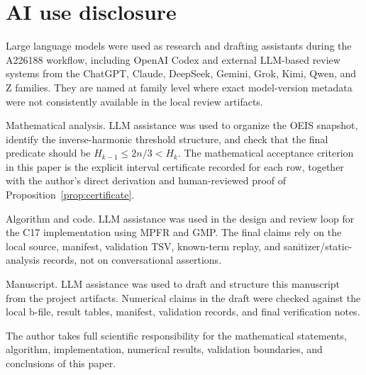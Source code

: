 \documentclass[11pt]{article}
\theoremstyle{definition}
\theoremstyle{remark}
\begin{document}
\section*{AI use disclosure}

Large language models were used as research and drafting assistants during the
A226188 workflow, including OpenAI Codex and external LLM-based review systems
from the ChatGPT, Claude, DeepSeek, Gemini, Grok, Kimi, Qwen, and Z families.
They are named at family level where exact model-version metadata were not
consistently available in the local review artifacts.

Mathematical analysis.  LLM assistance was used to organize the OEIS snapshot,
identify the inverse-harmonic threshold structure, and check that the final
predicate should be \(H_{k-1}\leq 2n/3 < H_k\).  The mathematical acceptance
criterion in this paper is the explicit interval certificate recorded for each
row, together with the author's direct derivation and human-reviewed proof of
Proposition~\ref{prop:certificate}.

Algorithm and code.  LLM assistance was used in the design and review loop for
the C17 implementation using MPFR and GMP.  The final claims rely on the local
source, manifest, validation TSV, known-term replay, and
sanitizer/static-analysis records, not on conversational assertions.

Manuscript.  LLM assistance was used to draft and structure this manuscript
from the project artifacts.  Numerical claims in the draft were
checked against the local b-file, result tables, manifest, validation records,
and final verification notes.

The author takes full scientific responsibility for the mathematical
statements, algorithm, implementation, numerical results, validation
boundaries, and conclusions of this paper.
\end{document}
